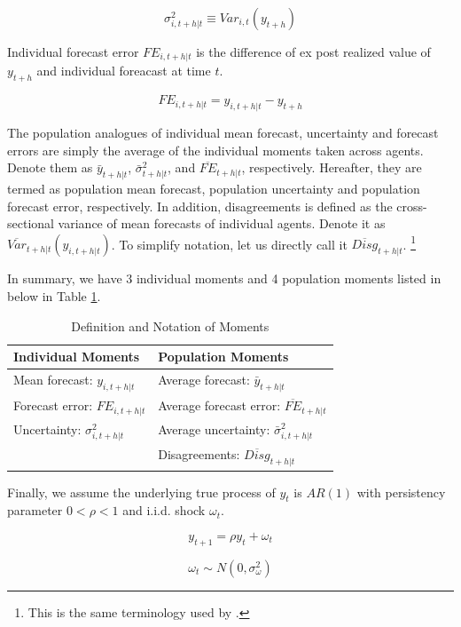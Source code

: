 \documentclass[]{article}
\begin{document}
$$\sigma^2_{i,t+h|t} \equiv Var_{i,t}( y_{t+h} )$$

Individual forecast error $FE_{i,t+h|t}$ is the difference of ex post realized value of $y_{t+h}$ and individual foreacast at time $t$. 

$$FE_{i,t+h|t} = y_{i,t+h|t} - y_{t+h}$$

The population analogues of individual mean forecast, uncertainty and forecast errors are simply the average of the individual moments taken across agents. Denote them as $\bar y_{t+h|t}$, $\bar \sigma^2_{t+h|t}$, and $\overline{FE}_{t+h|t}$, respectively. Hereafter, they are termed as population mean forecast, population uncertainty and population forecast error, respectively. In addition, disagreements is defined as the cross-sectional variance of mean forecasts of individual agents.  Denote it as $\overline{Var}_{t+h|t}(y_{i,t+h|t}) $. To simplify notation, let us directly call it $\overline{Disg}_{t+h|t}$.  \footnote{This is the same terminology used by \citet{xx}.}

In summary, we have 3 individual moments and 4 population moments listed in below in Table \ref{MomSum}.

\begin{table}[]
	\centering
		\caption{Definition and Notation of Moments}
		\label{MomSum}
	\begin{tabular}{ll}

		\hline 
		Individual Moments                                  & Population Moments                             \\
		\hline 
	Mean forecast: $y_{i,t+h|t}$                   & Average forecast: $\bar y_{t+h|t}$                   \\
		Forecast error: $FE_{i,t+h|t}$ & Average forecast error: $\overline{FE}_{t+h|t}$ \\
		Uncertainty: $\sigma^2_{i,t+h|t}$         & Average uncertainty:  $\bar \sigma^2_{i,t+h|t}$ \\
		& Disagreements:  $\overline{Disg}_{t+h|t}$       \\
		\hline 
	\end{tabular}
\end{table}

Finally, we assume the underlying true process of $y_{t}$ is $AR(1)$ with persistency parameter $0<\rho <1$ and i.i.d. shock $\omega_t$. 

$$y_{t+1} = \rho y_t + \omega_t$$

$$\omega_t \sim N(0,\sigma^2_{\omega})$$
\end{document}
